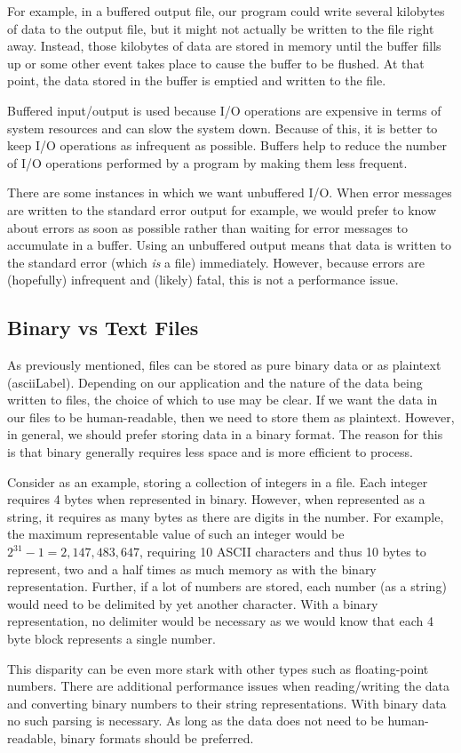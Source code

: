 For example, in a buffered output file, our program could
write several kilobytes of data to the output file, but it
might not actually be written to the file right away.  Instead,
those kilobytes of data are stored in memory until the
buffer fills up or some other event takes place to cause the
buffer to be flushed.  At that point, the data stored in the
buffer is emptied and written to the file.

Buffered input/output is used because I/O operations
are expensive in terms of system resources and can slow the system
down.  Because of this, it is better to keep I/O operations
as infrequent as possible.  Buffers help to reduce the number
of I/O operations performed by a program by making them less 
frequent.  

There are some instances in which we want unbuffered I/O.
When error messages are written to the standard error output
for example, we would prefer to know about errors as soon 
as possible rather than waiting for error messages to accumulate
in a buffer.  Using an unbuffered output means that data
is written to the standard error (which \emph{is} a file) 
immediately.  However, because errors are (hopefully) infrequent
and (likely) fatal, this is not a performance issue.

\subsection{Binary vs Text Files}

As previously mentioned, files can be stored as pure binary
data or as plaintext (\gls{asciiLabel}).  Depending on our
application and the nature of the data being written to files, 
the choice of which to use may be clear.  If we want the
data in our files to be human-readable, then we need
to store them as plaintext.  However, in general, we should 
prefer storing data in a 
binary format.  The reason for this is that binary generally
requires less space and is more efficient to process.

Consider as an example, storing a collection of integers
in a file.  Each integer requires 4 bytes when represented
in binary.  However, when represented as a string, it
requires as many bytes as there are digits in the number.
For example, the maximum representable value of such an
integer would be $2^{31}-1 = 2,147,483,647$, requiring
10 ASCII characters and thus 10 bytes to represent, two
and a half times as much memory as with the binary 
representation.  Further, if a lot of numbers are stored, 
each number (as a string) would need to be delimited by
yet another character.  With a binary representation, 
no delimiter would be necessary as we would know that 
each 4 byte block represents a single number.

This disparity can be even more stark with other types 
such as floating-point numbers.  There are additional
performance issues when reading/writing the data and
converting binary numbers to their string representations.
With binary data no such parsing is necessary. As long 
as the data does not need to be human-readable, binary
formats should be preferred.

